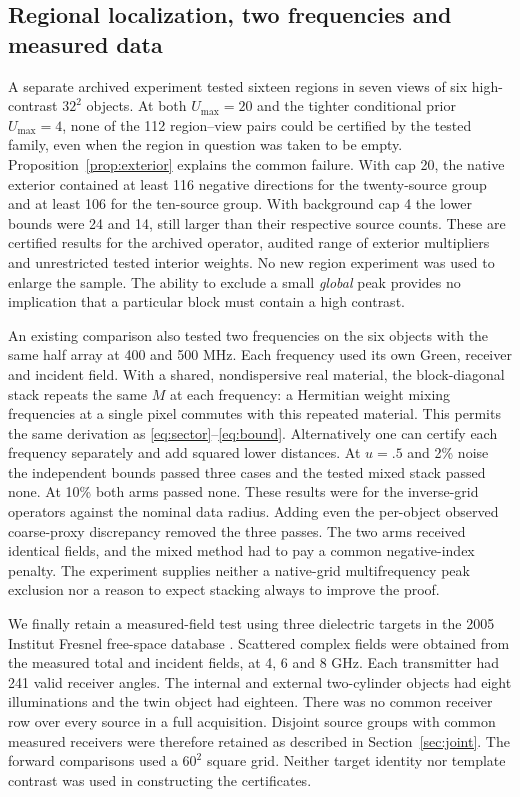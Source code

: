 \documentclass[anonymous,12pt]{iopjournal}
\theoremstyle{remark}\newtheorem{remark}[theorem]{Remark}
\numberwithin{equation}{section}
\begin{document}
\subsection{Regional localization, two frequencies and measured data}
A separate archived experiment tested sixteen regions in seven views of six high-contrast $32^2$ objects. At both $U_{\max}=20$ and the tighter conditional prior $U_{\max}=4$, none of the 112 region--view pairs could be certified by the tested family, even when the region in question was taken to be empty. Proposition~\ref{prop:exterior} explains the common failure. With cap 20, the native exterior contained at least 116 negative directions for the twenty-source group and at least 106 for the ten-source group. With background cap 4 the lower bounds were 24 and 14, still larger than their respective source counts. These are certified results for the archived operator, audited range of exterior multipliers and unrestricted tested interior weights. No new region experiment was used to enlarge the sample. The ability to exclude a small \emph{global} peak provides no implication that a particular block must contain a high contrast.

An existing comparison also tested two frequencies on the six objects with the same half array at 400 and 500 MHz. Each frequency used its own Green, receiver and incident field. With a shared, nondispersive real material, the block-diagonal stack repeats the same $M$ at each frequency: a Hermitian weight mixing frequencies at a single pixel commutes with this repeated material. This permits the same derivation as \eqref{eq:sector}--\eqref{eq:bound}. Alternatively one can certify each frequency separately and add squared lower distances. At $u=.5$ and 2\% noise the independent bounds passed three cases and the tested mixed stack passed none. At 10\% both arms passed none. These results were for the inverse-grid operators against the nominal data radius. Adding even the per-object observed coarse-proxy discrepancy removed the three passes. The two arms received identical fields, and the mixed method had to pay a common negative-index penalty. The experiment supplies neither a native-grid multifrequency peak exclusion nor a reason to expect stacking always to improve the proof.

We finally retain a measured-field test using three dielectric targets in the 2005 Institut Fresnel free-space database \cite{fresnel}. Scattered complex fields were obtained from the measured total and incident fields, at 4, 6 and 8 GHz. Each transmitter had 241 valid receiver angles. The internal and external two-cylinder objects had eight illuminations and the twin object had eighteen. There was no common receiver row over every source in a full acquisition. Disjoint source groups with common measured receivers were therefore retained as described in Section~\ref{sec:joint}. The forward comparisons used a $60^2$ square grid. Neither target identity nor template contrast was used in constructing the certificates.
\end{document}
